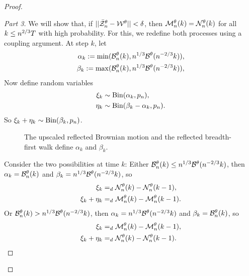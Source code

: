 \begin{proof}
\begin{proof}[Part 3]
We will show that, if $||\bar{\mathcal{Z}}^{\theta}_n - \mathcal{W}^{\theta}|| < \delta$, 
then $\mathcal{M}_n^{\theta}(k) = \mathcal{N}_n^{\theta}(k)$ for all $k \leq n^{2 / 3}T$ with high probability.
For this, we redefine both processes using a coupling argument.
At step $k$, let
\begin{equation} \label{E: def alpha beta}
\begin{aligned}
\alpha_k := \min(\mathcal{B}_n^{\theta}(k), n^{1 / 3}\mathcal{B}^{\theta}(n^{-2 / 3}k)), \\
\beta_k := \max(\mathcal{B}_n^{\theta}(k), n^{1 / 3}\mathcal{B}^{\theta}(n^{-2 / 3}k)),
\end{aligned}
\end{equation}
Now define random variables
\begin{equation} \label{E: def xi eta}
\begin{aligned}
\xi_k &\sim \operatorname*{Bin}(\alpha_k, p_n), \\
\eta_k &\sim \operatorname*{Bin}(\beta_k - \alpha_k, p_n).
\end{aligned}
\end{equation}
So $\xi_k + \eta_k \sim \operatorname*{Bin}(\beta_k, p_n)$.

\begin{figure}[ht]
	\centering
	
	\caption{The upscaled reflected Brownian motion and the reflected breadth-first walk define $\alpha_k$ and $\beta_k$.} 
	\label{F: BM BF-walk}
\end{figure}

Consider the two possibilities at time $k$:
Either $\mathcal{B}_n^{\theta}(k) \leq n^{1 / 3}\mathcal{B}^{\theta}(n^{-2 / 3}k)$,
then $\alpha_k = \mathcal{B}_n^{\theta}(k)$ and $\beta_k = n^{1 / 3}\mathcal{B}^{\theta}(n^{-2 / 3}k)$, 
so 
\begin{equation}
\begin{aligned}
\xi_k &=_d \mathcal{N}_n^{\theta}(k) - \mathcal{N}_n^{\theta}(k-1), \\
\xi_k + \eta_k &=_d \mathcal{M}_n^{\theta}(k) - \mathcal{M}_n^{\theta}(k-1).
\end{aligned}
\end{equation}
Or $\mathcal{B}_n^{\theta}(k) > n^{1 / 3}\mathcal{B}^{\theta}(n^{-2 / 3}k)$,
then $\alpha_k = n^{1 / 3}\mathcal{B}^{\theta}(n^{-2 / 3}k)$ and $\beta_k = \mathcal{B}_n^{\theta}(k)$, 
so
\begin{equation}
\begin{aligned}
\xi_k &=_d \mathcal{M}_n^{\theta}(k) - \mathcal{M}_n^{\theta}(k-1), \\
\xi_k + \eta_k &=_d \mathcal{N}_n^{\theta}(k) - \mathcal{N}_n^{\theta}(k-1).
\end{aligned}
\end{equation}


\end{proof}
\end{proof}
